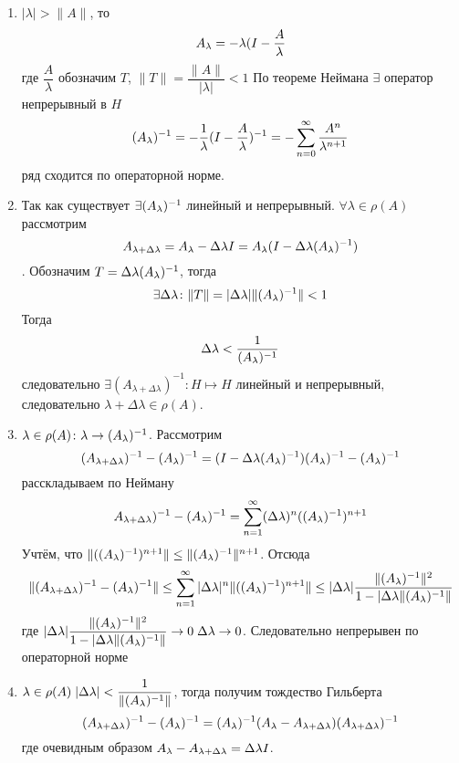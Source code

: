 \documentclass[14pt]{extarticle}
\begin{document}
\begin{Proof}
    \begin{enumerate}
        \item{$|\lambda| > \|A\|$, то
        $$
        A_\lambda = -\lambda(I - \dfrac{A}{\lambda}
        $$
        где $\dfrac{A}{\lambda}$  обозначим $T$, $\|T\| = \dfrac{\|A\|}{|\lambda|}<1$
        По теореме Неймана $\exists$ оператор непрерывный в $H$
        $$
        (A_\lambda)^{-1} = -\dfrac{1}{\lambda}(I - \dfrac{A}{\lambda})^{-1} =
            -\sum_{n=0}^\infty \dfrac{A^n}{\lambda^{n+1}}
        $$
        ряд сходится по операторной норме.}
        \item{Так как существует $\exists (A_\lambda)^{-1}$ линейный и непрерывный.
        $\forall \lambda \in \rho(A)$ рассмотрим 
        $$
        A_{\lambda + \Delta\lambda} = A_\lambda - \Delta\lambda I = A_\lambda(I - 
            \Delta\lambda(A_\lambda)^{-1})
            $$.
            Обозначим $T = \Delta\lambda(A_\lambda)^{-1}$, тогда
            $$
            \exists \Delta\lambda\colon \|T\|=|\Delta\lambda|\|(A_\lambda)^{-1}\| < 1
            $$
            Тогда 
            $$
            \Delta\lambda < \dfrac{1}{(A_\lambda)^{-1}}
            $$
             следовательно $\exists (A_{\lambda+\Delta\lambda})^{-1} : H \mapsto H$ линейный и непрерывный, следовательно
            $\lambda + \Delta\lambda \in \rho(A)$.}
        \item{$\lambda \in \rho(A)\colon \lambda \to (A_\lambda)^{-1}$.
        Рассмотрим
            $$
            (A_{\lambda + \Delta\lambda})^{-1} - (A_\lambda)^{-1} = (I - \Delta\lambda(A_\lambda)^{-1})(A_\lambda)^{-1} - (A_\lambda)^{-1}
            $$
            расскладываем по Нейману 
            $$
            A_{\lambda + \Delta\lambda})^{-1} - (A_\lambda)^{-1} = \sum_{n=1}^\infty
            (\Delta\lambda)^n((A_\lambda)^{-1})^{n+1}
            $$
            Учтём, что $\|((A_\lambda)^{-1})^{n+1}\| \le \|(A_\lambda)^{-1}\|^{n+1}$.
            Отсюда 
            $$
            \|(A_{\lambda + \Delta\lambda})^{-1} - (A_\lambda)^{-1}\| \le \sum_{n=1}^\infty |\Delta\lambda|^n\|((A_\lambda)^{-1})^{n+1}\| \le
            |\Delta\lambda| \dfrac{\|(A_\lambda)^{-1}\|^2}{1-|\Delta\lambda\|(A_\lambda)^{-1}\|}
            $$
            где $|\Delta\lambda| \dfrac{\|(A_\lambda)^{-1}\|^2}{1-|\Delta\lambda\|(A_\lambda)^{-1}\|} \to 0\; \Delta\lambda \to 0$.
            Следовательно непрерывен по операторной норме}
        \item{$\lambda \in \rho(A)\;|\Delta\lambda| < \dfrac{1}{\|(A_\lambda)^{-1}\|}$, тогда
        получим тождество Гильберта 
        $$
        (A_{\lambda + \Delta\lambda})^{-1} - (A_\lambda)^{-1} =
            (A_\lambda)^{-1}(A_\lambda - A_{\lambda + \Delta\lambda})(A_{\lambda + \Delta\lambda})^{-1} 
            $$
            где очевидным образом $A_\lambda - A_{\lambda + \Delta\lambda} = \Delta\lambda I$.
}
\end{enumerate}
\end{Proof}
\end{document}
